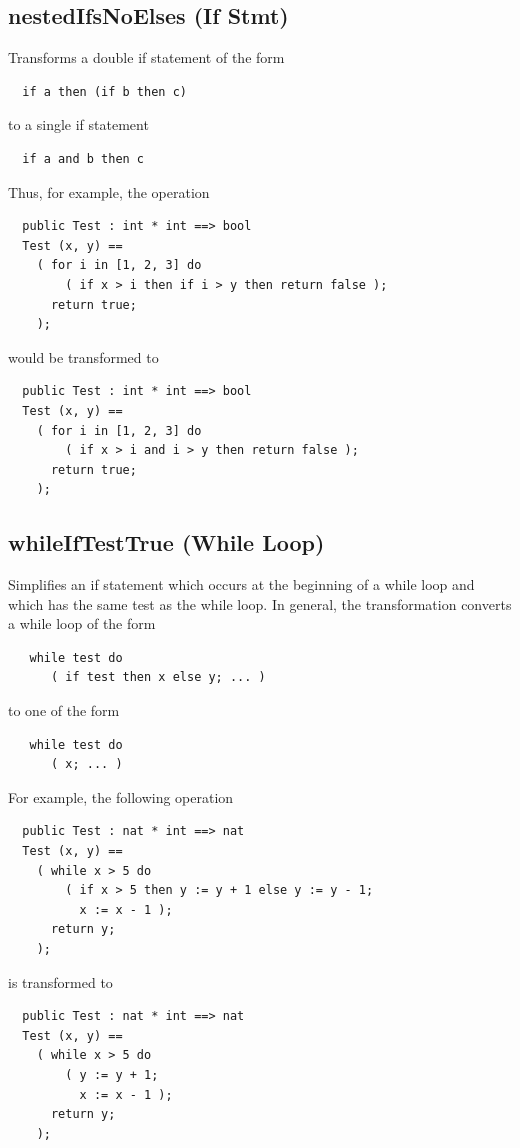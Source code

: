 \documentclass[\pformat,12pt]{article}
\begin{document}
\subsection{nestedIfsNoElses (If Stmt)}
  Transforms a double if statement of the form
\begin{verbatim}
  if a then (if b then c)
\end{verbatim}
to a single if statement
\begin{verbatim}
  if a and b then c
\end{verbatim}

Thus, for example, the operation
\begin{verbatim}
  public Test : int * int ==> bool
  Test (x, y) ==
    ( for i in [1, 2, 3] do
        ( if x > i then if i > y then return false );
      return true;
    );
\end{verbatim}
would be transformed to
\begin{verbatim}
  public Test : int * int ==> bool
  Test (x, y) ==
    ( for i in [1, 2, 3] do
        ( if x > i and i > y then return false );
      return true;
    );
\end{verbatim}

\subsection{whileIfTestTrue (While Loop)}
  Simplifies an if statement which occurs at the beginning of a while
  loop and which has the same test as the while loop. In general, the
  transformation converts a while loop of the form
\begin{verbatim}
   while test do  
      ( if test then x else y; ... ) 
\end{verbatim}
to one of the form
\begin{verbatim}
   while test do  
      ( x; ... ) 
\end{verbatim}

For example, the following operation
\begin{verbatim}
  public Test : nat * int ==> nat
  Test (x, y) ==
    ( while x > 5 do
        ( if x > 5 then y := y + 1 else y := y - 1; 
          x := x - 1 );
      return y;
    );
\end{verbatim}
is transformed to
\begin{verbatim}
  public Test : nat * int ==> nat
  Test (x, y) ==
    ( while x > 5 do
        ( y := y + 1; 
          x := x - 1 );
      return y;
    );

\end{verbatim}
\end{document}
